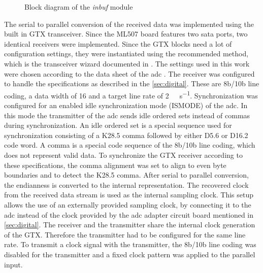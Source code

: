 \documentclass[12pt,a4paper,parskip=full,abstract=true,BCOR=12mm]{scrreprt}
\def\device#1{\mbox{\textit{#1}}}
\begin{document}
\begin{figure}[htb]
    \caption{Block diagram of the \device{inbuf} module}
    \label{fig:inbuf}
\end{figure}

The serial to parallel conversion of the received data was implemented using the built in GTX
transceiver. Since the ML507 board features two \gls{sata} ports, two
identical receivers were implemented. Since the GTX blocks need
a lot of configuration settings, they were instantiated using the
recommended method, which is the transceiver wizard documented in \cite{gtx_wizard}. The
settings used in this work were chosen according to the data sheet
of the \gls{adc} \cite{ltc2274}. The receiver was configured to handle the
specifications as described in the \cref{sec:digital}. These are 8b/10b line coding,
a data width of \SI{16}{\bit} and a target line rate of \SI{2}{\giga\bit\per\second}.
Synchronization was configured for an enabled idle synchronization mode (ISMODE) of the \gls{adc}. In this mode the
transmitter of the \gls{adc} sends idle ordered sets instead of commas during synchronization\cite{ltc2274}.
An idle ordered set is a special sequence used for synchronization consisting of a K28.5 comma
followed by either D5.6 or D16.2 code word. A comma is a special
code sequence of the 8b/10b line coding, which does not represent valid data\cite{gtx}.
To synchronize the GTX receiver according to these specifications, the comma
alignment was set to align to even byte boundaries and to detect the K28.5 comma. After
serial to parallel conversion, the endianness is converted to the internal representation.
The recovered clock from the received data stream is used as the internal sampling clock.
This setup allows the use of an externally provided sampling clock, by connecting it to
the \gls{adc} instead of the clock provided by the \gls{adc} adapter circuit board
mentioned in \cref{sec:digital}. The receiver and
the transmitter share the internal clock generation of the GTX. Therefore the transmitter
had to be configured for the same line rate. To transmit a clock signal with the
transmitter, the 8b/10b line coding was disabled for the transmitter and a fixed clock pattern was applied
to the parallel input.
\end{document}
